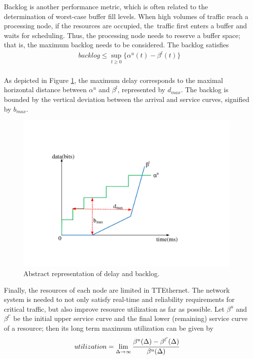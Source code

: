 \documentclass[electronics,article,accept,moreauthors,pdftex]{Definitions/mdpi}
\begin{document}
Backlog is another performance metric, which is often related to the determination of worst-case buffer fill levels. When high volumes of traffic reach a processing node, if the resources are occupied, the~traffic first enters a buffer and waits for scheduling. Thus, the processing node needs to reserve a buffer space; that is, the maximum backlog needs to be considered. The backlog satisfies
\begin{equation}
   \begin{aligned}
&	backlog \leq \sup_{t \geq 0} \{\alpha^u(t)-\beta^l(t)\}\\
   \end{aligned}
\end{equation}


As depicted in {Figure} \ref{cur}, the maximum delay corresponds to the maximal horizontal distance between $\alpha^u$ and $\beta^l$, represented by $d_{max}$. The backlog is bounded by the vertical deviation between the arrival and service curves, signified by $b_{max}$.

\begin{figure}[H]
\centering
\includegraphics[scale=0.35]{figures/curve}
\caption{Abstract representation of delay and backlog.}
\label{cur}
\end{figure}
Finally, the resources of each node are limited in TTEthernet. The network system is needed to not only satisfy real-time and reliability requirements for critical traffic, but also improve resource utilization as far as possible.
Let $\beta^u$ and $\beta^{l'}$ be the initial upper service curve and the final lower (remaining) service curve of a resource; then its long term maximum utilization can be given by
\begin{gather}
\begin{aligned}
 	utilization = \lim_{\Delta \to \infty} \cfrac{\beta^u(\Delta)-\beta^{l'}(\Delta)}{\beta^u(\Delta)} %
 \end{aligned}
\end{gather}
\end{document}
